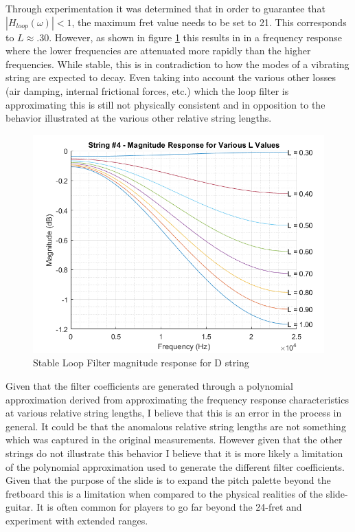 \documentclass[../main.tex]{subfiles}
\begin{document}
Through experimentation it was determined that in order to guarantee that $|H_{loop}(\omega)| < 1$, the maximum fret value needs to be set to 21. This corresponds to $L \approx .30$. However, as shown in figure \ref{fig:Str4LoopMagStable} this results in in a frequency response where the lower frequencies are attenuated more rapidly than the higher frequencies. While stable, this is in contradiction to how the modes of a vibrating string are expected to decay. Even taking into account the various other losses (air damping, internal frictional forces, etc.) which the loop filter is approximating this is still not physically consistent and in opposition to the behavior illustrated at the various other relative string lengths.

\begin{figure}[h]
    \centering
    \includegraphics[scale=.65]{./images/plots/String 4 - Loop Filter Magnitude Response - stable.png}
    \caption{Stable Loop Filter magnitude response for D string}
    \label{fig:Str4LoopMagStable}
\end{figure}

Given that the filter coefficients are generated through a polynomial approximation derived from approximating the frequency response characteristics at various relative string lengths, I believe that this is an error in the process in general. It could be that the anomalous relative string lengths are not something which was captured in the original measurements. However given that the other strings do not illustrate this behavior I believe that it is more likely a limitation of the polynomial approximation used to generate the different filter coefficients. Given that the purpose of the slide is to expand the pitch palette beyond the fretboard this is a limitation when compared to the physical realities of the slide-guitar. It is often common for players to go far beyond the 24-fret and experiment with extended ranges.
\end{document}
